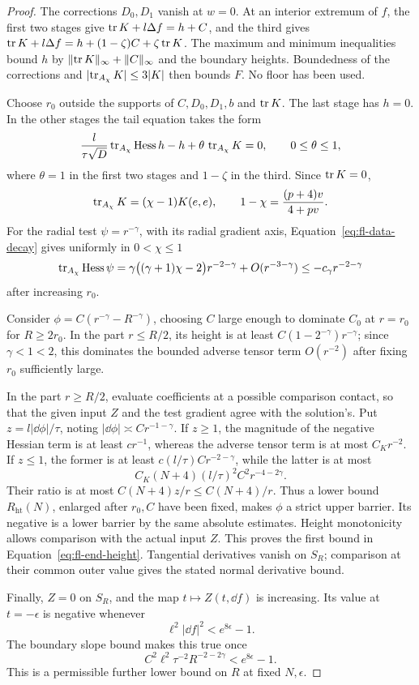 \begin{proof}
The corrections \(D_0,D_1\) vanish at \(w=0\).  At an interior
extremum of \(f\), the first two stages give
\(\operatorname{tr} K+l\Delta f=h+C\), and the third gives
\(\operatorname{tr} K+l\Delta f=h+(1-\zeta)C+\zeta\operatorname{tr} K\).
The maximum and minimum inequalities bound \(h\) by
\(\lVert\operatorname{tr} K\rVert_\infty+\lVert C\rVert_\infty\) and the
boundary heights.  Boundedness of the corrections and
\(\lvert\operatorname{tr}_{A_\chi}K\rvert\le3\lvert K\rvert\) then bounds \(F\).
No floor has been used.

Choose \(r_0\) outside the supports of \(C,D_0,D_1,b\) and
\(\operatorname{tr} K\).  The last stage has \(h=0\).  In the other stages the
tail equation takes the form
\begin{equation}
\label{eq:fl-tail-trace}
 \frac{l}{\tau\sqrt D}\operatorname{tr}_{A_\chi}\operatorname{Hess} h-h
       +\theta\,\operatorname{tr}_{A_\chi}K=0,\qquad 0\le\theta\le1,
\end{equation}
where \(\theta=1\) in the first two stages and \(1-\zeta\) in the
third.  Since \(\operatorname{tr} K=0\),
\[
 \operatorname{tr}_{A_\chi}K=(\chi-1)K(e,e),\qquad
 1-\chi=\frac{(p+4)v}{4+pv}.
\]
For the radial test \(\psi=r^{-\gamma}\), with its radial gradient
axis, Equation~\eqref{eq:fl-data-decay} gives uniformly in
\(0<\chi\le1\)
\[
 \operatorname{tr}_{A_\chi}\operatorname{Hess}\psi
 =\gamma\bigl((\gamma+1)\chi-2\bigr)r^{-2-\gamma}
                 +O(r^{-3-\gamma})
 \le-c_\gamma r^{-2-\gamma}
\]
after increasing \(r_0\).

Consider \(\phi=C(r^{-\gamma}-R^{-\gamma})\), choosing \(C\)
large enough to dominate \(C_0\) at \(r=r_0\) for
\(R\ge2r_0\).  In the part \(r\le R/2\), its height is at least
\(C(1-2^{-\gamma})r^{-\gamma}\); since \(\gamma<1<2\),
this dominates the bounded adverse tensor term \(O(r^{-2})\)
after fixing \(r_0\) sufficiently large.

In the part \(r\ge R/2\), evaluate coefficients at a possible
comparison contact, so that the given input \(Z\) and the test
gradient agree with the solution's.  Put
\(z=l\lvert\dd\phi\rvert/\tau\), noting
\(\lvert\dd\phi\rvert\asymp C r^{-1-\gamma}\).
If \(z\ge1\), the magnitude of the negative Hessian term is at
least \(c r^{-1}\), whereas the adverse tensor term is at most
\(C_Kr^{-2}\).  If \(z\le1\), the former is at least
\(c(l/\tau)C r^{-2-\gamma}\), while the latter is at most
\[
 C_K(N+4)(l/\tau)^2 C^2 r^{-4-2\gamma}.
\]
Their ratio is at most \(C(N+4)z/r\le C(N+4)/r\).
Thus a lower bound \(R_{\mathrm{ht}}(N)\), enlarged after
\(r_0,C\) have been fixed, makes \(\phi\) a strict upper barrier.
Its negative is a lower barrier by the same absolute estimates.
Height monotonicity allows comparison with the actual input \(Z\).
This proves the first bound in Equation~\eqref{eq:fl-end-height}.
Tangential derivatives vanish on \(S_R\); comparison at their common
outer value gives the stated normal derivative bound.

Finally, \(Z=0\) on \(S_R\), and the map \(t\mapsto Z(t,\dd f)\)
is increasing.  Its value at \(t=-\epsilon\) is negative whenever
\[
 \ell^2\lvert\dd f\rvert^2<e^{8\epsilon}-1.
\]
The boundary slope bound makes this true once
\[
 C^2\ell^2\tau^{-2}R^{-2-2\gamma}<e^{8\epsilon}-1 .
\]
This is a permissible further lower bound on \(R\) at fixed
\(N,\epsilon\).
\end{proof}

